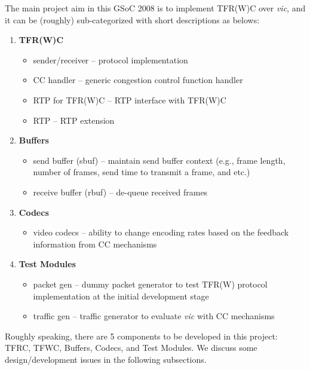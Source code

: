 The main project aim in this GSoC 2008 is to implement TFR(W)C over \emph{vic}, and it
can be (roughly) sub-categorized with short descriptions as belows:

\begin{enumerate} %

\item \textbf{TFR(W)C}

\begin{itemize}
\item \textsf{sender/receiver} -- protocol implementation
\item \textsf{CC handler} -- generic congestion control function handler
\item \textsf{RTP for TFR(W)C} -- RTP interface with TFR(W)C
\item \textsf{RTP} -- RTP extension
\end{itemize}

\item \textbf{Buffers}
\begin{itemize}
\item \textsf{send buffer (sbuf)} --  maintain send buffer context (e.g., frame
length, number of frames, send time to transmit a frame, and etc.)
\item \textsf{receive buffer (rbuf)} -- de-queue received frames
\end{itemize}

\item \textbf{Codecs}
\begin{itemize}
\item \textsf{video codecs} -- ability to change encoding rates based on the
feedback information from CC mechanisms
\end{itemize}

\item \textbf{Test Modules}
\begin{itemize}
\item \textsf{packet gen} -- dummy packet generator to test TFR(W) protocol
implementation at the initial development stage
\item \textsf{traffic gen} -- traffic generator to evaluate \emph{vic} with CC
mechanisms
\end{itemize}

\end{enumerate} %

Roughly speaking, there are 5 components to be developed in this project: TFRC,
TFWC, Buffers, Codecs, and Test Modules. We discuss some design/development
issues in the following subsections.

